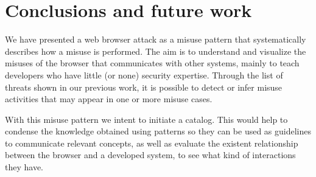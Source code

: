 \documentclass{sig-alternate-05-2015}
\begin{document}
\section{Conclusions and future work}





We have presented a web browser attack as a misuse pattern that systematically describes how a misuse is performed. The aim is to understand and visualize the misuses of the browser that communicates with other systems, mainly to teach developers who have little (or none) security expertise. Through the list of threats shown in our previous work, it is possible to detect or infer misuse activities that may appear in one or more misuse cases.

With this misuse pattern we intent to initiate a catalog. This would help to condense the knowledge obtained using patterns so they can be used as guidelines to communicate relevant concepts, as well as evaluate the existent relationship between the browser and a developed system, to see what kind of interactions they have.
\end{document}
